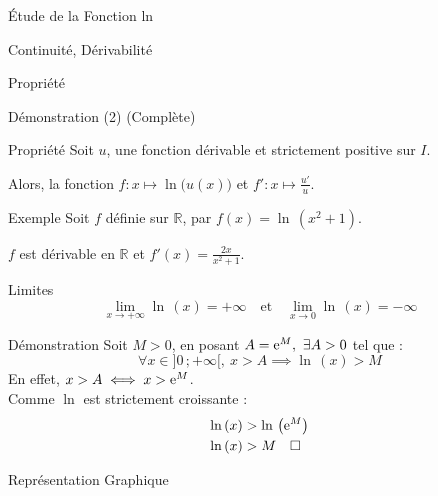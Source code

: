 \documentclass{cours}
\begin{document}
\begin{Gpartie}{Étude de la Fonction ln}
\begin{Spartie}{Continuité, Dérivabilité}
\begin{SSpartie}{Propriété}
\begin{SSSpartie}{Démonstration (2) (Complète)}
                \end{SSSpartie}
            \end{SSpartie}
            \begin{SSpartie}{Propriété}
                Soit $u$, une fonction dérivable et strictement positive sur $I$.

                Alors, la fonction $f:x\mapsto\ln\big(u(x)\big)$ et $\boxed{f':x\mapsto\frac{u'}{u}}$.
                \begin{SSSpartie}{Exemple}
                    Soit $f$ définie sur $\mathbb{R}$, par $f(x)=\ln\,(x^2+1)$.

                    $f$ est dérivable en $\mathbb{R}$ et $f'(x)=\frac{2x}{x^2+1}$.
                \end{SSSpartie}
            \end{SSpartie}
        \end{Spartie}
        \begin{Spartie}{Limites}
            \[\boxed{\lim_{x\to+\infty}\ln\,(x)=+\infty\quad\text{et}\quad\lim_{x\to 0}\ln\,(x)=-\infty}\]
            \begin{SSpartie}{Démonstration} 
                Soit $M>0$, en posant $A=\mathrm{e}^M,~\exists A>0$ tel que :
                \[\forall x\in\big]0\,;+\infty\big[,~x>A\implies\ln\,(x)>M\]
                En effet, $x>A\iff x>\mathrm{e}^M$. \\ Comme $\ln$ est strictement croissante :
                \[\begin{aligned}[t]
                    \ln\,(x)&>\ln\,\left(\mathrm{e}^M\right) \\
                    \ln\,(x)&>M\quad\square
                \end{aligned}\]
            \end{SSpartie}
        \end{Spartie}
        \begin{Spartie}{Représentation Graphique}
            \begin{center}
                \parbox{\linewidth}{}
            \end{center}
        \end{Spartie}
    \end{Gpartie}
\end{document}
